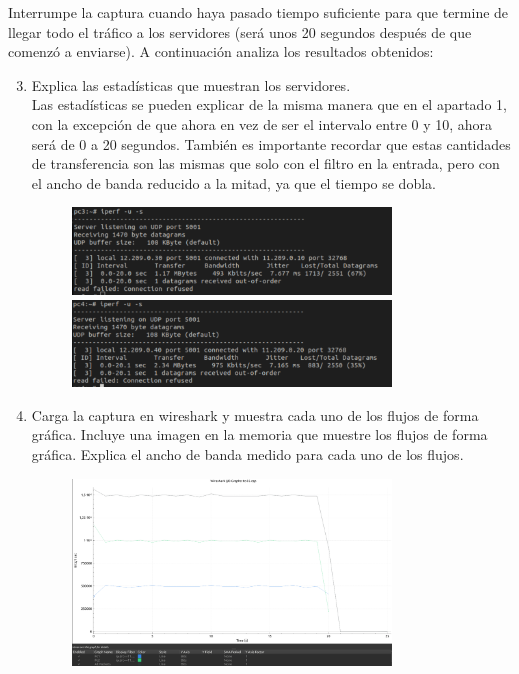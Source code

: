 \documentclass[12pt, a4paper]{report}
\begin{document}
Interrumpe la captura cuando haya pasado tiempo suficiente para que termine de llegar todo el
tráfico a los servidores (será unos 20 segundos después de que comenzó a enviarse). A continuación
analiza los resultados obtenidos:
\begin{enumerate}
	\setcounter{enumi}{2}
	\item Explica las estadísticas que muestran los servidores.\\
	
	Las estadísticas se pueden explicar de la misma manera que en el apartado 1, con la excepción de que ahora en vez de ser el intervalo entre 0 y 10, ahora será de 0 a 20 segundos. También es importante recordar que estas cantidades de transferencia son las mismas que solo con el filtro en la entrada, pero con el ancho de banda reducido a la mitad, ya que el tiempo se dobla.
	\begin{figure}[H]
		\centering
		\includegraphics[width=0.8\textwidth]{ej1.3.1_3_a}
		\includegraphics[width=0.8\textwidth]{ej1.3.1_3_b}
	\end{figure}
	\item Carga la captura en wireshark y muestra cada uno de los flujos de forma gráfica. Incluye una
	imagen en la memoria que muestre los flujos de forma gráfica. Explica el ancho de banda medido
	para cada uno de los flujos.
	\begin{figure}[H]
		\centering
		\includegraphics[width=0.8\textwidth]{ej1.3.1_4}

\end{figure}
\end{enumerate}
\end{document}
